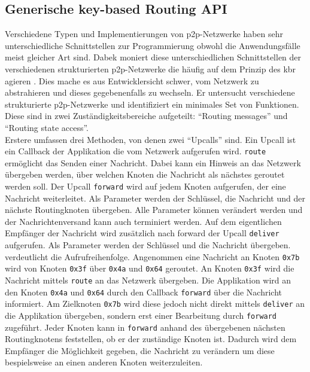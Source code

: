 \subsection{Generische key-based Routing API}
\label{chap:grundlagen:api}
Verschiedene Typen und Implementierungen von p2p-Netzwerke haben sehr unterschiedliche Schnittstellen zur Programmierung obwohl die Anwendungsfälle meist gleicher Art sind. Dabek moniert diese unterschiedlichen Schnittstellen der verschiedenen strukturierten p2p-Netzwerke die häufig auf dem Prinzip des \ac{kbr} agieren \cite{Dabek2003Towards}. Dies mache es aus Entwicklersicht schwer, vom Netzwerk zu abstrahieren und dieses gegebenenfalls zu wechseln. Er untersucht verschiedene strukturierte p2p-Netzwerke und identifiziert ein minimales Set von Funktionen. Diese sind in zwei Zuständigkeitsbereiche aufgeteilt: \enquote{Routing messages} und \enquote{Routing state access}.\\
Erstere umfassen drei Methoden, von denen zwei \enquote{Upcalls} sind. Ein Upcall ist ein Callback der Applikation die vom Netzwerk aufgerufen wird. \texttt{route} ermöglicht das Senden einer Nachricht. Dabei kann ein Hinweis an das Netzwerk übergeben werden, über welchen Knoten die Nachricht als nächstes geroutet werden soll. Der Upcall \texttt{forward} wird auf jedem Knoten aufgerufen, der eine Nachricht weiterleitet. Als Parameter werden der Schlüssel, die Nachricht und der nächste Routingknoten übergeben. Alle Parameter können verändert werden und der Nachrichtenversand kann auch terminiert werden. Auf dem eigentlichen Empfänger der Nachricht wird zusätzlich nach forward der Upcall \texttt{deliver} aufgerufen. Als Parameter werden der Schlüssel und die Nachricht übergeben.\\
 verdeutlicht die Aufrufreihenfolge. Angenommen eine Nachricht an Knoten \texttt{0x7b} wird von Knoten \texttt{0x3f} über \texttt{0x4a} und \texttt{0x64} geroutet. An Knoten \texttt{0x3f} wird die Nachricht mittels \texttt{route} an das Netzwerk übergeben. Die Applikation wird an den Knoten \texttt{0x4a} und \texttt{0x64} durch den Callback \texttt{forward} über die Nachricht informiert. Am Zielknoten \texttt{0x7b} wird diese jedoch nicht direkt mittels \texttt{deliver} an die Applikation übergeben, sondern erst einer Bearbeitung durch \texttt{forward} zugeführt. Jeder Knoten kann in \texttt{forward} anhand des übergebenen nächsten Routingknotens feststellen, ob er der zuständige Knoten ist. Dadurch wird dem Empfänger die Möglichkeit gegeben, die Nachricht zu verändern um diese bespielsweise an einen anderen Knoten weiterzuleiten.

